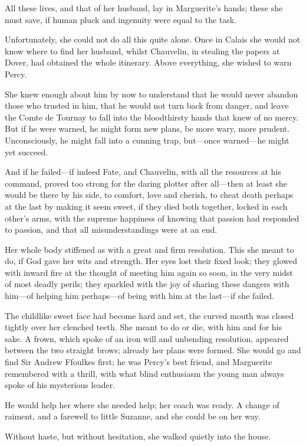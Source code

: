 All these lives, and that of her husband, lay in Marguerite's hands; these she must save, if human pluck and ingenuity were equal to the task.

Unfortunately, she could not do all this quite alone. Once in Calais she would not know where to find her husband, whilst Chauvelin, in stealing the papers at Dover, had obtained the whole itinerary. Above everything, she wished to warn Percy.

She knew enough about him by now to understand that he would never abandon those who trusted in him, that he would not turn back from danger, and leave the Comte de Tournay to fall into the bloodthirsty hands that knew of no mercy. But if he were warned, he might form new plans, be more wary, more prudent. Unconsciously, he might fall into a cunning trap, but—once warned—he might yet succeed.

And if he failed—if indeed Fate, and Chauvelin, with all the resources at his command, proved too strong for the daring plotter after all—then at least she would be there by his side, to comfort, love and cherish, to cheat death perhaps at the last by making it seem sweet, if they died both together, locked in each other's arms, with the supreme happiness of knowing that passion had responded to passion, and that all misunderstandings were at an end.

Her whole body stiffened as with a great and firm resolution. This she meant to do, if God gave her wits and strength. Her eyes lost their fixed look; they glowed with inward fire at the thought of meeting him again so soon, in the very midst of most deadly perils; they sparkled with the joy of sharing these dangers with him—of helping him perhaps—of being with him at the last—if she failed.

The childlike sweet face had become hard and set, the curved mouth was closed tightly over her clenched teeth. She meant to do or die, with him and for his sake. A frown, which spoke of an iron will and unbending resolution, appeared between the two straight brows; already her plans were formed. She would go and find Sir Andrew Ffoulkes first; he was Percy's best friend, and Marguerite remembered with a thrill, with what blind enthusiasm the young man always spoke of his mysterious leader.

He would help her where she needed help; her coach was ready. A change of raiment, and a farewell to little Suzanne, and she could be on her way.

Without haste, but without hesitation, she walked quietly into the house.